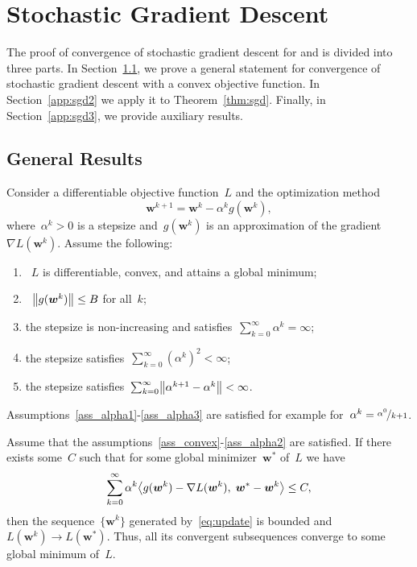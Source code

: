 \section{Stochastic Gradient Descent}

The proof of convergence of stochastic gradient descent for \PatMat and \PatMatNP is divided into three parts. In Section~\ref{app:sgd1}, we prove a general statement for convergence of stochastic gradient descent with a convex objective function. In Section~\ref{app:sgd2} we apply it to Theorem~\ref{thm:sgd}. Finally, in Section~\ref{app:sgd3}, we provide auxiliary results.

\subsection{General Results}\label{app:sgd1}

Consider a differentiable objective function~$L$ and the optimization method
\begin{equation}\label{eq:update}
  \bm{w}^{k+1} = \bm{w}^k - \alpha^k g(\bm{w}^k),
\end{equation}
where~$\alpha^k > 0$ is a stepsize and~$g(\bm{w}^k)$ is an approximation of the gradient~$\nabla L(\bm{w}^k)$. Assume the following:
\begin{enumerate}[label={(\textbf{A\arabic*})}, left = 15pt]
  \item \label{ass_convex}~$L$ is differentiable, convex, and attains a global minimum;
  \item \label{ass_gbound}~$\norm{g(\bm{w}^k)}\leq B$ for all~$k$;
  \item \label{ass_alpha1} the stepsize is non-increasing and satisfies~$\sum_{k=0}^\infty \alpha^k = \infty$;
  \item \label{ass_alpha2} the stepsize satisfies~$\sum_{k=0}^\infty (\alpha^k)^2<\infty$;
  \item \label{ass_alpha3} the stepsize satisfies~$\sum_{k=0}^\infty \norm{\alpha^{k+1}-  \alpha^k}<\infty$.
\end{enumerate}
Assumptions~\ref{ass_alpha1}-\ref{ass_alpha3} are satisfied for example for~$\alpha^k = \nicefrac{\alpha^0}{k+1}$.

\begin{theorem}\label{thm:convergence}
  Assume that the assumptions~\ref{ass_convex}-\ref{ass_alpha2} are satisfied. If there exists some~$C$ such that for some global minimizer~$\bm{w}^*$ of~$L$ we have
  \begin{equation}\label{eq:nec_cond}
    \sum_{k=0}^\infty \alpha^k \inner{g(\bm{w}^k) - \nabla L(\bm{w}^k)}{\bm{w}^* - \bm{w}^k} \leq C,
  \end{equation}
  then the sequence~$\{\bm{w}^k\}$ generated by~\eqref{eq:update} is bounded and~$L(\bm{w}^k) \to L(\bm{w}^*)$. Thus, all its convergent subsequences converge to some global minimum of~$L$.
\end{theorem}

